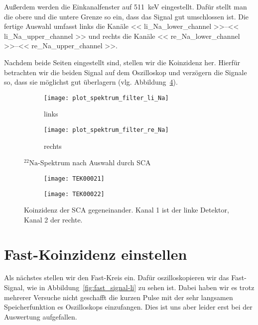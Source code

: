\documentclass[11pt, ngerman, fleqn, DIV=15, headinclude, BCOR=2cm]{scrreprt}
\begin{document}
Außerdem werden die Einkanalfenster auf \SI{511}{\kilo\electronvolt}
eingestellt. Dafür stellt man die obere und die untere Grenze so ein, dass das
Signal gut umschlossen ist. 
Die fertige Auswahl umfasst links die Kanäle
\numrange{<< li_Na_lower_channel >>}{<< li_Na_upper_channel >>} und rechts
die Kanäle
\numrange{<< re_Na_lower_channel >>}{<< re_Na_upper_channel >>}.

Nachdem beide Seiten eingestellt sind, stellen
wir die Koinzidenz her. Hierfür betrachten wir die beiden Signal auf dem
Oszilloskop und verzögern die Signale so, dass sie möglichst gut überlagern
(vlg. Abbildung~\ref{fig:slow_signal_sca_koinzidenz}).

\begin{figure}[htbp]
	\centering
	\begin{subfigure}{0.49 \textwidth}
		\texttt{[image: plot\_spektrum\_filter\_li\_Na]}
		\caption{%
			links
		}
		\label{fig:slow_sca_eingestellt-li_plot}
	\end{subfigure}
	\begin{subfigure}{0.49 \textwidth}
		\texttt{[image: plot\_spektrum\_filter\_re\_Na]}
		\caption{%
			rechts
		}
		\label{fig:slow_sca_eingestellt-re_plot}
	\end{subfigure}
	\caption{%
		$^{22}\text{Na}$-Spektrum nach Auswahl durch SCA
	}
	\label{fig:slow_signal_sca_eingestellt_plot}
\end{figure}

\begin{figure}[htbp]
	\centering
	\begin{subfigure}{0.49 \textwidth}
		\texttt{[image: TEK00021]}
	\end{subfigure}
	\begin{subfigure}{0.49 \textwidth}
		\texttt{[image: TEK00022]}
	\end{subfigure}
	\caption{%
		Koinzidenz der SCA gegeneinander. Kanal 1 ist der linke
		Detektor, Kanal 2 der rechte.
	}
	\label{fig:slow_signal_sca_koinzidenz}
\end{figure}

\clearpage

\section{Fast-Koinzidenz einstellen}
Als nächstes stellen wir den Fast-Kreis ein. Dafür oszilloskopieren wir
das Fast-Signal, wie in Abbildung~\ref{fig:fast_signal-li} zu sehen ist. 
Dabei haben wir es trotz mehrerer Versuche nicht geschafft die kurzen Pulse mit der
sehr langsamen Speicherfunktion es Oszilloskops einzufangen. Dies ist uns aber
leider erst bei der Auswertung aufgefallen.
\end{document}
